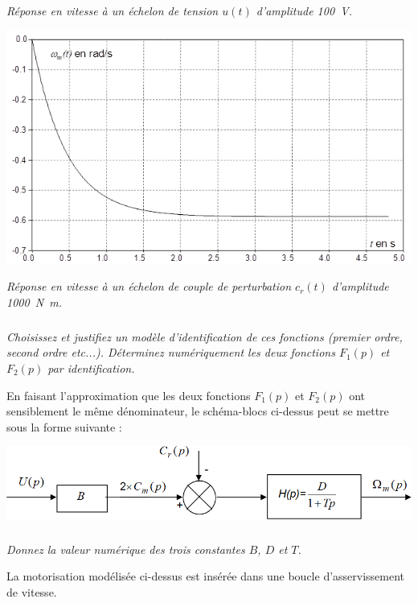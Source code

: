 \documentclass[10pt,fleqn]{article} %
\begin{document}
\begin{multicols}{2}
\begin{center}
\textit{Réponse en vitesse à un échelon de tension $u(t)$ d’amplitude \SI{100}{V}.}
\end{center}

\begin{center}
\includegraphics[width=\linewidth]{images2/fig_06_b}

\textit{Réponse en vitesse à un échelon de couple de perturbation $c_r(t)$ d’amplitude \SI{1000}{N.m}.}
\end{center}



\subparagraph{}
\textit{Choisissez et justifiez un modèle d’identification de ces fonctions (premier ordre, second ordre etc...). Déterminez numériquement les deux fonctions $F_1(p)$ et $F_2(p)$ par identification.}


En faisant l’approximation que les deux fonctions $F_1(p)$ et $F_2(p)$ ont sensiblement le même dénominateur, le schéma-blocs ci-dessus peut se mettre sous la forme suivante :
\begin{center}
	\includegraphics[width=\linewidth]{images2/fig_03}
\end{center}


\subparagraph{}
\textit{Donnez la valeur numérique des trois constantes $B$, $D$ et $T$.}

La motorisation modélisée ci-dessus est insérée dans une boucle d’asservissement de vitesse.


\end{multicols}
\end{document}
